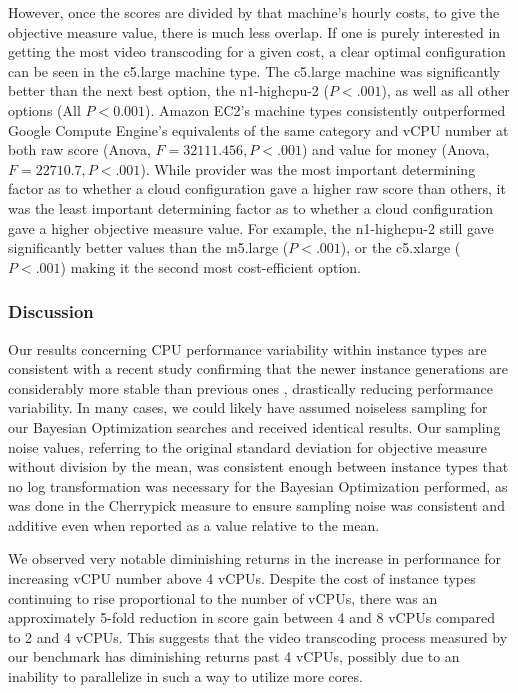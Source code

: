 \documentclass{report}
\begin{document}
However, once the scores are divided by that machine's hourly costs, to give the objective measure value, there is much less overlap. If one is purely interested in getting the most video transcoding for a given cost, a clear optimal configuration can be seen in the c5.large machine type. The c5.large machine was significantly better than the next best option, the n1-highcpu-2 ($P < .001$), as well as all other options (All $P < 0.001$). Amazon EC2's  machine types consistently outperformed Google Compute Engine's equivalents of the same category and vCPU number at both raw score (Anova, $F = 32111.456, P < .001$) and value for money (Anova, $F = 22710.7, P < .001$). While provider was the most important determining factor as to whether a cloud configuration gave a higher raw score than others, it was the least important determining factor as to whether a cloud configuration gave a higher objective measure value. For example, the n1-highcpu-2 still gave significantly better values than the m5.large ($P < .001$), or the c5.xlarge ($P < .001$) making it the second most cost-efficient option. 


\subsubsection{Discussion}
Our results concerning CPU performance variability within instance types are consistent with a recent study \cite{Scheuner2018} confirming that the newer instance generations are considerably more stable than previous ones \cite{Leitner2014}, drastically reducing performance variability. In many cases, we could likely have assumed noiseless sampling for our Bayesian Optimization searches and received identical results. Our sampling noise values, referring to the original standard deviation for objective measure without division by the mean, was consistent enough between instance types that no log transformation was necessary for the Bayesian Optimization performed, as was done in the Cherrypick measure to ensure sampling noise was consistent and additive even when reported as a value relative to the mean\cite{Alipourfard2017}.

We observed very notable diminishing returns in the increase in performance for increasing vCPU number above 4 vCPUs. Despite the cost of instance types continuing to rise proportional to the number of vCPUs, there was an approximately 5-fold reduction in score gain between 4 and 8 vCPUs compared to 2 and 4 vCPUs. This suggests that the video transcoding process measured by our benchmark has diminishing returns past 4 vCPUs, possibly due to an inability to parallelize in such a way to utilize more cores.
\end{document}
